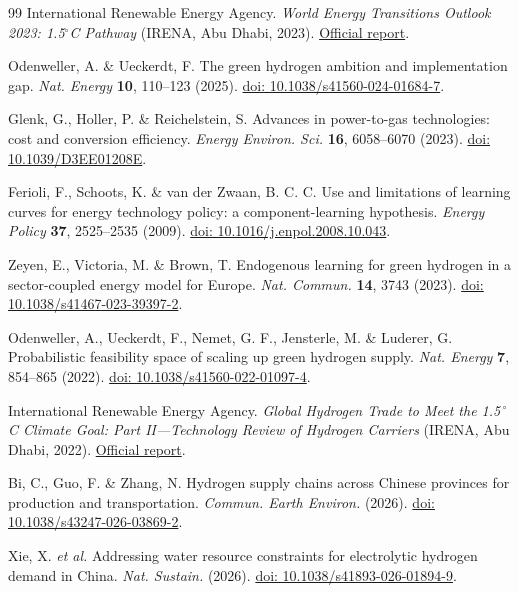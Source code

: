 \documentclass[pdflatex,sn-nature]{sn-jnl}
\begin{document}
\begin{thebibliography}{99}
International Renewable Energy Agency. \emph{World Energy Transitions Outlook 2023: 1.5$^{\circ}$C Pathway} (IRENA, Abu Dhabi, 2023). \href{https://www.irena.org/Publications/2023/Jun/World-Energy-Transitions-Outlook-2023}{Official report}.

Odenweller, A. \& Ueckerdt, F. The green hydrogen ambition and implementation gap. \emph{Nat. Energy} \textbf{10}, 110--123 (2025). \href{https://doi.org/10.1038/s41560-024-01684-7}{doi: 10.1038/s41560-024-01684-7}.

Glenk, G., Holler, P. \& Reichelstein, S. Advances in power-to-gas technologies: cost and conversion efficiency. \emph{Energy Environ. Sci.} \textbf{16}, 6058--6070 (2023). \href{https://doi.org/10.1039/D3EE01208E}{doi: 10.1039/D3EE01208E}.

Ferioli, F., Schoots, K. \& van der Zwaan, B. C. C. Use and limitations of learning curves for energy technology policy: a component-learning hypothesis. \emph{Energy Policy} \textbf{37}, 2525--2535 (2009). \href{https://doi.org/10.1016/j.enpol.2008.10.043}{doi: 10.1016/j.enpol.2008.10.043}.

Zeyen, E., Victoria, M. \& Brown, T. Endogenous learning for green hydrogen in a sector-coupled energy model for Europe. \emph{Nat. Commun.} \textbf{14}, 3743 (2023). \href{https://doi.org/10.1038/s41467-023-39397-2}{doi: 10.1038/s41467-023-39397-2}.

Odenweller, A., Ueckerdt, F., Nemet, G. F., Jensterle, M. \& Luderer, G. Probabilistic feasibility space of scaling up green hydrogen supply. \emph{Nat. Energy} \textbf{7}, 854--865 (2022). \href{https://doi.org/10.1038/s41560-022-01097-4}{doi: 10.1038/s41560-022-01097-4}.

International Renewable Energy Agency. \emph{Global Hydrogen Trade to Meet the 1.5\,$^\circ$C Climate Goal: Part II---Technology Review of Hydrogen Carriers} (IRENA, Abu Dhabi, 2022). \href{https://www.irena.org/publications/2022/Apr/Global-hydrogen-trade-Part-II}{Official report}.

Bi, C., Guo, F. \& Zhang, N. Hydrogen supply chains across Chinese provinces for production and transportation. \emph{Commun. Earth Environ.} (2026). \href{https://doi.org/10.1038/s43247-026-03869-2}{doi: 10.1038/s43247-026-03869-2}.

Xie, X. \emph{et al.} Addressing water resource constraints for electrolytic hydrogen demand in China. \emph{Nat. Sustain.} (2026). \href{https://doi.org/10.1038/s41893-026-01894-9}{doi: 10.1038/s41893-026-01894-9}.


\end{thebibliography}
\end{document}
